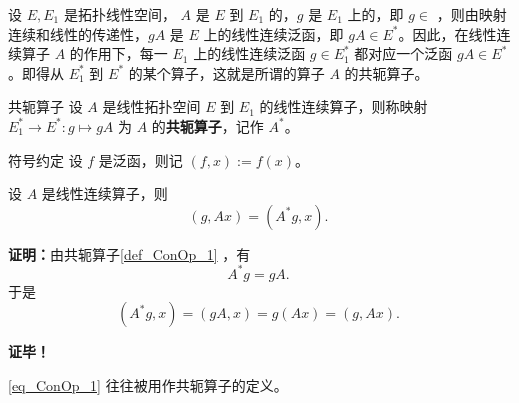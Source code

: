 

设 $E,E_1$ 是拓扑线性空间， $A$ 是 $E$ 到 $E_1$ 的，$g$ 是 $E_1$ 上的，即 $g\in$ ，则由映射连续和线性的传递性，$gA$ 是 $E$ 上的线性连续泛函，即 $gA\in E^*$。因此，在线性连续算子 $A$ 的作用下，每一 $E_1$ 上的线性连续泛函 $g\in E_1^*$ 都对应一个泛函 $gA\in E^*$。即得从 $E_1^*$ 到 $E^*$ 的某个算子，这就是所谓的算子 $A$ 的共轭算子。

\begin{definition}{共轭算子}\label{def_ConOp_1}
设 $A$ 是线性拓扑空间 $E$ 到 $E_1$ 的线性连续算子，则称映射 $E_1^*\rightarrow  E^*:g\mapsto gA$ 为 $A$ 的\textbf{共轭算子}，记作 $A^*$。
\end{definition}

\begin{definition}{符号约定}
设 $f$ 是泛函，则记 $(f,x):=f(x)$。
\end{definition}

\begin{theorem}{}
设 $A$ 是线性连续算子，则
\begin{equation}\label{eq_ConOp_1}
(g,Ax)=(A^* g,x).~
\end{equation}
\end{theorem}

\textbf{证明：}由共轭算子\autoref{def_ConOp_1} ，有
\begin{equation}
A^*g=gA.~
\end{equation}
于是 
\begin{equation}
(A^*g,x)=(gA,x)=g(Ax)=(g,Ax).~
\end{equation}

\textbf{证毕！}
 
 
\autoref{eq_ConOp_1} 往往被用作共轭算子的定义。


